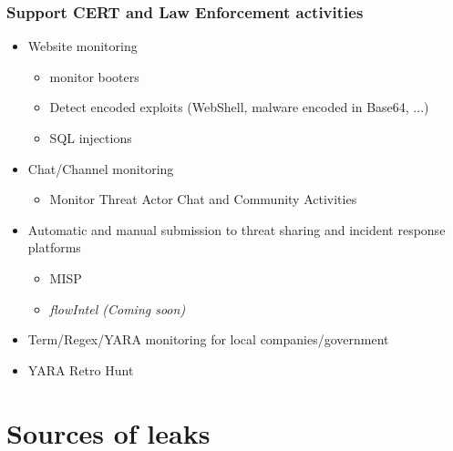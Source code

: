 \documentclass[aspectratio=169]{beamer}
\begin{document}
\begin{frame}
    \frametitle{Support CERT and Law Enforcement activities}
    	\begin{itemize}
		    \item Website monitoring
		    	\begin{itemize}
				    \item monitor booters
				    \item Detect encoded exploits (WebShell, malware encoded in Base64, ...)
				    \item SQL injections
		    	\end{itemize}
		    \item Chat/Channel monitoring
		        \begin{itemize}
				    \item Monitor Threat Actor Chat and Community Activities
		        \end{itemize}
		    \item Automatic and manual submission to threat sharing and incident response platforms
			    \begin{itemize}
				    \item MISP
				    \item \textit{flowIntel (Coming soon)}
			    \end{itemize}
		    \item Term/Regex/YARA monitoring for local companies/government
		    \item YARA Retro Hunt
        \end{itemize}
\end{frame}

\section{Sources of leaks}
\end{document}
